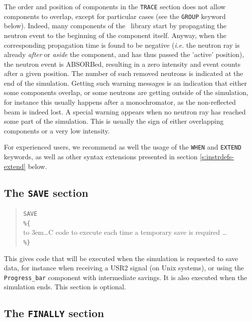 The order and position of components in the \texttt{TRACE} section does not
allow components to overlap, except for particular cases (see the \texttt{GROUP}
keyword below).  Indeed, many components of the \MCS\ library
 start by propagating the neutron event to the
beginning of the component itself.  Anyway, when the corresponding propagation
time is found to be negative ({\it i.e.} the neutron ray is already \emph{after}
or \emph{aside} the component, and has thus passed the 'active' position), the
neutron event is ABSORBed, resulting in a zero intensity and event counts after
a given position. The number of such removed neutrons is indicated at the end of
the simulation.  Getting such warning messages is an indication that either some
components overlap, or some neutrons are getting outside of the simulation, for
instance this usually happens after a monochromator, as the non-reflected beam
is indeed lost. A special warning appears when no neutron ray has reached some
part of the simulation. This is usually the sign of either overlapping
components or a very low intensity. 

For experienced users, we recommend as well the usage of the \texttt{WHEN} and
\texttt{EXTEND} keywords, as well as other syntax extensions presented in
section \ref{s:instrdefs-extend} below.

\subsection{The \texttt{SAVE} section}
\label{s:save}

\begin{quote}
  \texttt{SAVE} \\
  \verb|%{| \\
  \hbox to 3em{}\ldots C code to execute each time a temporary save is required \ldots \\
  \verb|%}|
\end{quote}  This gives code that will be
executed when the simulation is requested to save data, for instance when
receiving a USR2 signal (on Unix systems), or using the \verb+Progress_bar+
component with intermediate savings. It is also executed when the simulation
ends. This section is optional.

\subsection{The \texttt{FINALLY} section}
\label{s:finally}


